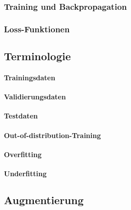 
\subsubsection{Training und Backpropagation}
\label{sec:training_backpropagation}


\subsubsection{Loss-Funktionen}
\label{sec:loss_funktionen}


\subsection{Terminologie}
\label{sec:terminologie}

\paragraph{Trainingsdaten}
\paragraph{Validierungsdaten}
\paragraph{Testdaten}
\paragraph{Out-of-distribution-Training}
\paragraph{Overfitting}
\paragraph{Underfitting}

\subsection{Augmentierung}
\label{sec:augmentierung}

